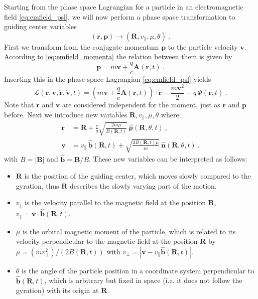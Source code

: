\documentclass{scrartcl}
\renewcommand{\vec}[1]{\boldsymbol{#1}}
\newcommand{\uv}[1]{\hat{\vec{#1}}}
\newcommand{\rv}{\vec{r}}
\newcommand{\rvdot}{\dot{\rv}}
\newcommand{\rvgc}{\vec{R}} %
\newcommand{\PSL}{\mathcal{L}}
\newcommand{\subparallel}{{\scriptscriptstyle\parallel}}
\begin{document}
Starting from the phase space Lagrangian for a particle in an electromagnetic field \eqref{eq:emfield_psl}, we will now perform a phase space transformation to guiding center variables 
\begin{equation*}
(\rv, \vec{p}) \rightarrow (\vec{R}, v_\subparallel, \mu, \theta) \ .
\end{equation*}
First we transform from the conjugate momentum $\vec{p}$ to the particle velocity $\vec{v}$. According to \eqref{eq:emfield_momenta} the relation between them is given by
\begin{equation*}
\vec{p} = m\vec{v} + \frac{q}{c}\vec{A}(\rv,t) \ .
\end{equation*}
Inserting this in the phase space Lagrangian \eqref{eq:emfield_psl} yields
\begin{equation*}
\PSL(\rv,\vec{v},\rvdot,\dot{\vec{v}},t) = \left(m\vec{v} + \frac{q}{c}\vec{A}(\rv,t)\right)\cdot\rvdot - \frac{m\vec{v}^2}{2} - q\,\Phi(\rv,t) \ .
\end{equation*}
Note that $\dot{\rv}$ and $\vec{v}$ are considered independent for the moment, just as $\dot{\rv}$ and $\vec{p}$ before. Next we introduce new variables $\rvgc, v_\subparallel,\mu,\theta$ where
\begin{align}
\rv &= \rvgc + \frac{c}{q}\sqrt{\frac{2m\mu}{B(\rvgc,t)}}\ \uv{\rho}(\rvgc,\theta,t) \ ,\label{eq:trans_gc_r}\\
\vec{v} &= v_\subparallel\,\uv{b}(\rvgc,t) + \sqrt{\frac{2B(\rvgc,t)\mu}{m}}\ \uv{n}(\rvgc,\theta,t) \ . \label{eq:trans_gc_v}
\end{align}
with $B = |\vec{B}|$ and $\uv{b} = \vec{B}/B$.
These new variables can be interpreted as follows: 
\begin{itemize}
\item $\rvgc$ is the position of the guiding center, which moves slowly compared to the gyration, thus $\rvgc$ describes the slowly varying part of the motion.
\item $v_\subparallel$ is the velocity parallel to the magnetic field at the position $\rvgc$, $v_\subparallel = \vec{v}\cdot\uv{b}(\rvgc,t)$.
\item $\mu$ is the orbital magnetic moment of the particle, which is related to its velocity perpendicular to the magnetic field at the position $\rvgc$ by $\mu = (mv_\perp^2)/(2B(\rvgc,t))$ with $v_\perp = |\vec{v}-v_\subparallel\uv{b}(\rvgc,t)|$.
\item $\theta$ is the angle of the particle position in a coordinate system perpendicular to $\uv{b}(\rvgc,t)$, which is arbitrary but fixed in space (i.e. it does not follow the gyration) with its origin at $\rvgc$.
\end{itemize}
\end{document}
